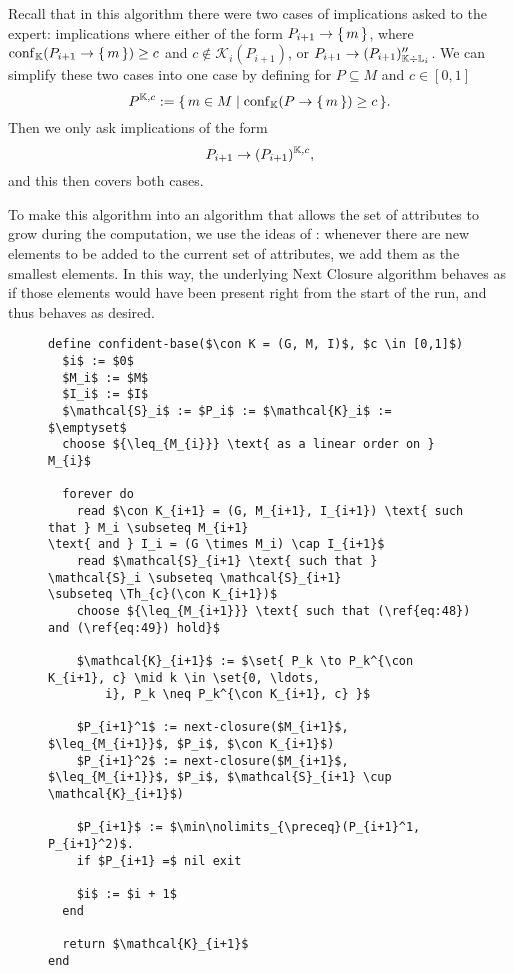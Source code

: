 Recall that in this algorithm there were two cases of implications asked to the expert:
implications where either of the form $P_{i+1} \to {\ensuremath{\{\,m\,\}}}$, where $\operatorname{conf}_{{\mathbb{K}}}(P_{i+1}
\to {\ensuremath{\{\,m\,\}}}) \ge c$ and $c \notin \mathcal{K}_{i}(P_{i+1})$, or $P_{i+1} \to
(P_{i+1})_{{\mathbb{K}} \div {\ensuremath{\mathbb{L}}}_{i}}''$.  We can simplify these two cases into one case by
defining for $P \subseteq M$ and $c \in [0,1]$
\begin{equation*}
  P^{{\mathbb{K}}, c} := {\{\, m \in M \mid \operatorname{conf}_{{\mathbb{K}}}(P \to {\ensuremath{\{\,m\,\}}}) \ge c \,\}}.
\end{equation*}
Then we only ask implications of the form
\begin{equation*}
  P_{i+1} \to (P_{i+1})^{{\mathbb{K}}, c},
\end{equation*}
and this then covers both cases.

To make this algorithm into an algorithm that allows the set of attributes to grow during
the computation, we use the ideas of : whenever there are new
elements to be added to the current set of attributes, we add them as the smallest
elements.  In this way, the underlying Next Closure algorithm behaves as if those elements
would have been present right from the start of the run, and thus behaves as desired.


\begin{figure}[tp]
  \begin{Algorithm}
    \hspace*{0cm}
    \label{alg:confident-base/growing-attributes}
    \begin{lstlisting}
define confident-base($\con K = (G, M, I)$, $c \in [0,1]$)
  $i$ := $0$
  $M_i$ := $M$
  $I_i$ := $I$
  $\mathcal{S}_i$ := $P_i$ := $\mathcal{K}_i$ := $\emptyset$
  choose ${\leq_{M_{i}}} \text{ as a linear order on } M_{i}$
  
  forever do
    read $\con K_{i+1} = (G, M_{i+1}, I_{i+1}) \text{ such that } M_i \subseteq M_{i+1}
\text{ and } I_i = (G \times M_i) \cap I_{i+1}$
    read $\mathcal{S}_{i+1} \text{ such that } \mathcal{S}_i \subseteq \mathcal{S}_{i+1}
\subseteq \Th_{c}(\con K_{i+1})$
    choose ${\leq_{M_{i+1}}} \text{ such that (\ref{eq:48}) and (\ref{eq:49}) hold}$

    $\mathcal{K}_{i+1}$ := $\set{ P_k \to P_k^{\con K_{i+1}, c} \mid k \in \set{0, \ldots,
        i}, P_k \neq P_k^{\con K_{i+1}, c} }$

    $P_{i+1}^1$ := next-closure($M_{i+1}$, $\leq_{M_{i+1}}$, $P_i$, $\con K_{i+1}$)
    $P_{i+1}^2$ := next-closure($M_{i+1}$, $\leq_{M_{i+1}}$, $P_i$, $\mathcal{S}_{i+1} \cup \mathcal{K}_{i+1}$)

    $P_{i+1}$ := $\min\nolimits_{\preceq}(P_{i+1}^1, P_{i+1}^2)$.
    if $P_{i+1} =$ nil exit

    $i$ := $i + 1$
  end

  return $\mathcal{K}_{i+1}$  
end
    \end{lstlisting}
  \end{Algorithm}
\end{figure}

